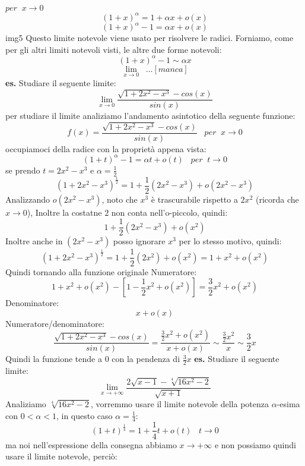 $per \;\; x \rightarrow 0$
\newline
\[
    (1+x)^{\alpha} = 1+\alpha x + o(x)
\]
\[
    (1+x)^{\alpha} -1 = \alpha x +o(x)
\]
img5
\newline
Questo limite notevole viene usato per risolvere le radici.
\newline
Forniamo, come per gli altri limiti notevoli visti, le altre due forme notevoli:
\[
    (1+x)^{\alpha} -1 \sim \alpha x
\]
\[
    \lim_{x \rightarrow 0} \;\; \dots [manca]
\]
\newline
\newline
\textbf{es.} Studiare il seguente limite:
\[
    \lim_{x\rightarrow 0} \frac{\sqrt{1+2x^2-x^3}-cos(x)}{sin(x)}
\]
per studiare il limite analiziamo l'andamento asintotico della seguente funzione:
\[
    f(x) = \frac{\sqrt{1+2x^2-x^3}-cos(x)}{sin(x)} \;\;\; per \;\; x \rightarrow 0
\]
occupiamoci della radice con la proprietà appena vista:
\[
    (1+t)^{\alpha} -1 = \alpha t +o(t) \;\;\; per \;\; t \rightarrow 0
\]
se prendo $t = 2x^2 -x^3$ e $\alpha = \frac{1}{2}$
\[
    (1+2x^2-x^3)^{\frac{1}{2}} = 1 + \frac{1}{2} (2x^2-x^3) + o(2x^2 - x^3)
\]
Analizzando $o(2x^2 - x^3)$, noto che $x^3$ è trascurabile rispetto a $2x^2$ (ricorda che $x \rightarrow 0$), Inoltre la costatne $2$ non conta nell'o-piccolo, quindi:
\[
    1 + \frac{1}{2} (2x^2-x^3) + o(x^2)
\]
Inoltre anche in $(2x^2-x^3)$ posso ignorare $x^3$ per lo stesso motivo, quindi:
\[
    (1+2x^2-x^3)^{\frac{1}{2}} = 1 + \frac{1}{2} (2x^2) + o(x^2) = 1 + x^2 + o(x^2)
\]
Quindi tornando alla funzione originale
\newline
Numeratore:
\[
    1 + x^2 + o(x^2) -[1-\frac{1}{2}x^2 +o(x^2)]= \frac{3}{2}x^2 +o(x^2)
\]
Denominatore:
\[
    x+o(x)
\]
Numeratore/denominatore:
\[
    \frac{\sqrt{1+2x^2-x^3}-cos(x)}{sin(x)} = \frac{\frac{3}{2}x^2 +o(x^2)}{x+o(x)} \sim \frac{\frac{3}{2}x^2}{x} \sim \frac{3}{2}x
\]
Quindi la funzione tende a $0$ con la pendenza di $\frac{3}{2}x$
\newline
\newline
\newline
\textbf{es.} Studiare il seguente limite:
\[
    \lim_{x\rightarrow + \infty} \frac{2\sqrt{x-1}-\sqrt[4]{16x^2-2}}{\sqrt{x+1}}
\]
Analiziamo $\sqrt[4]{16x^2-2}$, vorremmo usare il limite notevole della potenza $\alpha$-esima con $0<\alpha<1$, in questo caso $\alpha = \frac{1}{4}$:
\[
    (1+t)^{\frac{1}{4}} = 1+\frac{1}{4}t +o(t) \;\;\; t \rightarrow 0
\]
ma noi nell'espressione della consegna abbiamo $x\rightarrow + \infty$ e non possiamo quindi usare il limite notevole, perciò:
